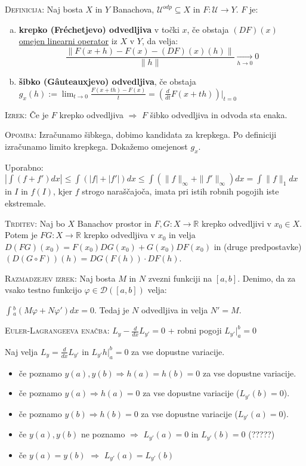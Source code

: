 \documentclass[8pt,a4paper]{amsart}
\theoremstyle{definition} %
\theoremstyle{plain} %
\let\oldint\int
\renewcommand{\int}{\oldint \!}
\newcommand{\R}{\mathbb R}
\begin{document}
\textsc{Definicija: }Naj bosta $X$ in $Y$ Banachova, $\mathcal{U}^{odp} \subseteq X$ in $F:\mathcal{U}\longrightarrow Y$. $F$ je:
\begin{enumerate}[a)]
\item \textbf{krepko (Fréchetjevo) odvedljiva} v točki $x$, če obstaja $(DF)(x)$ \underline{omejen linearni operator} iz $X$ v $Y$, da velja:
$$ \frac{\|F(x+h)-F(x)-(DF)(x)(h)\|}{\|h\|} \xrightarrow[h \to 0]{} 0 $$

\item \textbf{šibko (Gâuteauxjevo) odvedljiva}, če obstaja
$ g_x(h):= \lim_{t \to 0} \frac{F(x+th)-F(x)}{t} = (\frac{d}{dt}F(x + th)) |_{t = 0}$
\end{enumerate}

\textsc{Izrek:} Če je $F$ krepko odvedljiva $\Longrightarrow$ $F$ šibko odvedljiva in odvoda sta enaka.

\textsc{Opomba:} Izračunamo šibkega, dobimo kandidata za krepkega. Po definiciji
izračunamo limito krepkega. Dokažemo omejenost $g_x$.

Uporabno: $| \int (f+f')dx| \leq \int (|f|+|f'|)dx \leq \int (\|f\|_\infty + \|f'\|_\infty)dx = \int \|f\|_1dx$ in  $I$ in $f(I)$, kjer $f$ strogo naraščajoča, imata pri istih robnih pogojih iste ekstremale.

\textsc{Trditev:} Naj bo $X$ Banachov prostor in $F,G:X \longrightarrow \R$
krepko odvedljivi v $x_0 \in X$. Potem je $F G:X \longrightarrow \R $ krepko
odvedljiva v $x_0$ in velja $D(FG)(x_0)=F(x_0)DG(x_0)+G(x_0)DF(x_0)$ in (druge predpostavke) $(D(G \circ F))(h) = DG(F(h)) \cdot DF(h)$.

\textsc{Razmadzejev izrek:} Naj bosta $M$ in $N$ zvezni funkciji na $[a,b]$.
Denimo, da za vsako testno funkcijo $\varphi \in \mathcal{D}([a,b])$ velja:

$
\int_a^b (M\varphi + N\varphi')dx = 0.
$
Tedaj je $N$ odvedljiva in velja $N'=M$.

\textsc{Euler-Lagrangeeva enačba:} $L_y - \frac{d}{dx}L_{y'}=0$ + robni pogoji $L_{y'} |_a^b = 0$

Naj velja $L_y=\frac{d}{dx}L_{y'}$ in $L_{y'}h |_a^b = 0$ za vse dopustne variacije.
\begin{itemize}
\item če poznamo $y(a),y(b) \Longrightarrow h(a)=h(b)=0$ za vse dopustne variacije.
\item če poznamo $y(a) \Longrightarrow h(a)=0$ za vse dopustne variacije ($L_{y'}(b)=0$).
\item če poznamo $y(b) \Longrightarrow h(b)=0$ za vse dopustne variacije ($L_{y'}(a)=0$).
\item če $y(a),y(b)$ ne poznamo $\Longrightarrow$ $L_{y'}(a)=0$ in $L_{y'}(b)=0$ (?????)
\item če $y(a) = y(b)$ $\Longrightarrow$ $L_{y'}(a)= L_{y'}(b)$
\end{itemize}
\end{document}
